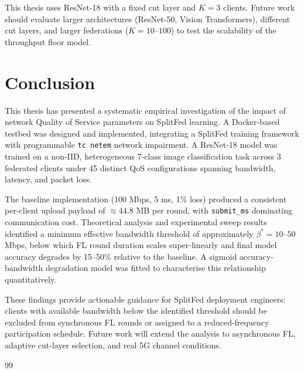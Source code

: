\documentclass[12pt,a4paper]{report}
\begin{document}
This thesis uses ResNet-18 with a fixed cut layer and $K = 3$ clients. Future work should evaluate larger architectures (ResNet-50, Vision Transformers), different cut layers, and larger federations ($K = 10$--$100$) to test the scalability of the throughput floor model.

\chapter{Conclusion}
\label{ch:conclusion}

This thesis has presented a systematic empirical investigation of the impact of network Quality of Service parameters on SplitFed learning. A Docker-based testbed was designed and implemented, integrating a SplitFed training framework with programmable \texttt{tc netem} network impairment. A ResNet-18 model was trained on a non-IID, heterogeneous 7-class image classification task across 3 federated clients under 45 distinct QoS configurations spanning bandwidth, latency, and packet loss.

The baseline implementation (100 Mbps, 5 ms, 1\% loss) produced a consistent per-client upload payload of $\approx 44.8$ MB per round, with \texttt{submit\_ms} dominating communication cost. Theoretical analysis and experimental sweep results identified a minimum effective bandwidth threshold of approximately $\beta^* = 10$--$50$ Mbps, below which FL round duration scales super-linearly and final model accuracy degrades by 15--50\% relative to the baseline. A sigmoid accuracy-bandwidth degradation model was fitted to characterise this relationship quantitatively.

These findings provide actionable guidance for SplitFed deployment engineers: clients with available bandwidth below the identified threshold should be excluded from synchronous FL rounds or assigned to a reduced-frequency participation schedule. Future work will extend the analysis to asynchronous FL, adaptive cut-layer selection, and real 5G channel conditions.


\begin{thebibliography}{99}



\end{thebibliography}
\end{document}
